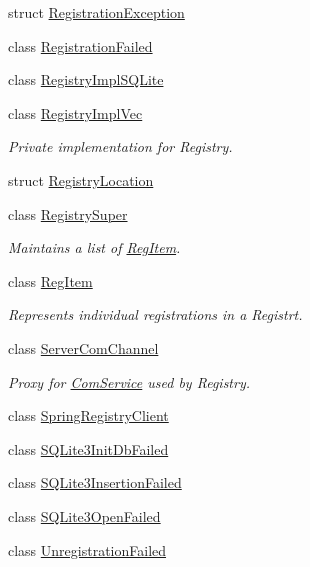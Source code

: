 \begin{DoxyCompactItemize}
struct \hyperlink{structregistry_1_1RegistrationException}{Registration\+Exception}
\item 
class \hyperlink{classregistry_1_1RegistrationFailed}{Registration\+Failed}
\item 
class \hyperlink{classregistry_1_1RegistryImplSQLite}{Registry\+Impl\+S\+Q\+Lite}
\item 
class \hyperlink{classregistry_1_1RegistryImplVec}{Registry\+Impl\+Vec}
\begin{DoxyCompactList}\small\item\em Private implementation for Registry. \end{DoxyCompactList}\item 
struct \hyperlink{structregistry_1_1RegistryLocation}{Registry\+Location}
\item 
class \hyperlink{classregistry_1_1RegistrySuper}{Registry\+Super}
\begin{DoxyCompactList}\small\item\em Maintains a list of \hyperlink{classregistry_1_1RegItem}{Reg\+Item}. \end{DoxyCompactList}\item 
class \hyperlink{classregistry_1_1RegItem}{Reg\+Item}
\begin{DoxyCompactList}\small\item\em Represents individual registrations in a Registrt. \end{DoxyCompactList}\item 
class \hyperlink{classregistry_1_1ServerComChannel}{Server\+Com\+Channel}
\begin{DoxyCompactList}\small\item\em Proxy for \hyperlink{classregistry_1_1ComService}{Com\+Service} used by Registry. \end{DoxyCompactList}\item 
class \hyperlink{classregistry_1_1SpringRegistryClient}{Spring\+Registry\+Client}
\item 
class \hyperlink{classregistry_1_1SQLite3InitDbFailed}{S\+Q\+Lite3\+Init\+Db\+Failed}
\item 
class \hyperlink{classregistry_1_1SQLite3InsertionFailed}{S\+Q\+Lite3\+Insertion\+Failed}
\item 
class \hyperlink{classregistry_1_1SQLite3OpenFailed}{S\+Q\+Lite3\+Open\+Failed}
\item 
class \hyperlink{classregistry_1_1UnregistrationFailed}{Unregistration\+Failed}
\end{DoxyCompactItemize}
